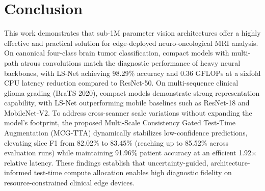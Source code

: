\section{Conclusion}

This work demonstrates that sub-1M parameter vision architectures offer a highly effective and practical solution for edge-deployed neuro-oncological MRI analysis. On canonical four-class brain tumor classification, compact models with multi-path atrous convolutions match the diagnostic performance of heavy neural backbones, with LS-Net achieving 98.29\% accuracy and 0.36 GFLOPs at a sixfold CPU latency reduction compared to ResNet-50. On multi-sequence clinical glioma grading (BraTS 2020), compact models demonstrate strong representation capability, with LS-Net outperforming mobile baselines such as ResNet-18 and MobileNet-V2. To address cross-scanner scale variations without expanding the model's footprint, the proposed Multi-Scale Consistency Gated Test-Time Augmentation (MCG-TTA) dynamically stabilizes low-confidence predictions, elevating slice F1 from 82.02\% to 83.45\% (reaching up to 85.52\% across evaluation runs) while maintaining 91.96\% patient accuracy at an efficient 1.92$\times$ relative latency. These findings establish that uncertainty-guided, architecture-informed test-time compute allocation enables high diagnostic fidelity on resource-constrained clinical edge devices.
